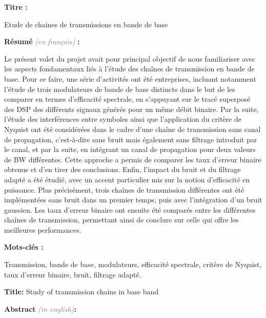 \documentclass[11pt]{article}
\newcommand{\Gray}[1]{\textcolor{gray}{\textit{#1}}}
\begin{document}

{\bfseries Titre :}

Etude de chaines de transmissions en bande de base

{\bfseries Résumé} \Gray{(en français)} {\bfseries :}

Le présent volet du projet avait pour principal objectif de nous familiariser avec les aspects fondamentaux liés à l'étude des chaînes de transmission en bande de base. Pour ce faire, une série d'activités ont été entreprises, incluant notamment l'étude de trois modulateurs de bande de base distincts dans le but de les comparer en termes d'efficacité spectrale, en s'appuyant sur le tracé superposé des DSP des différents signaux générés pour un même débit binaire. Par la suite, l'étude des interférences entre symboles ainsi que l'application du critère de Nyquist ont été considérées dans le cadre d'une chaîne de transmission sans canal de propagation, c’est-à-dire sans bruit mais également sans filtrage introduit par le canal, et par la suite, en intégrant un canal de propagation pour deux valeurs de BW différentes. Cette approche a permis de comparer les taux d’erreur binaire obtenus et d'en tirer des conclusions. Enfin, l'impact du bruit et du filtrage adapté a été étudié, avec un accent particulier mis sur la notion d'efficacité en puissance. Plus précisément, trois chaînes de transmission différentes ont été implémentées sans bruit dans un premier temps, puis avec l'intégration d'un bruit gaussien. Les taux d'erreur binaire ont ensuite été comparés entre les différentes chaînes de transmission, permettant ainsi de conclure sur celle qui offre les meilleures performances.

{\bfseries Mots-clés :}

Transmission, bande de base, modulateurs, efficacité spectrale, critère de Nyquist, taux d'erreur binaire, bruit, filtrage adapté.

\vspace*{3mm}
\hrulefill
\vspace*{3mm}


{\bfseries Title:}
Study of transmission chains in base band


{\bfseries Abstract} \Gray{(in english)}{\bfseries:}
\end{document}
